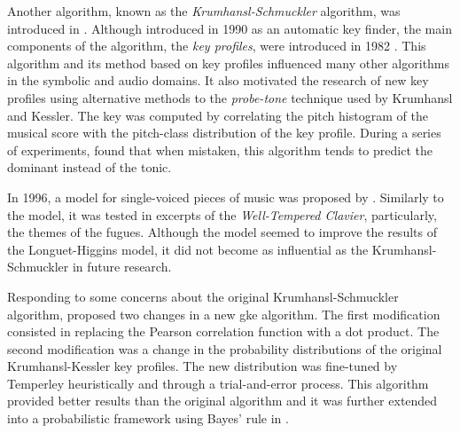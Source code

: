Another algorithm, known as the \emph{Krumhansl-Schmuckler}
algorithm, was introduced in
\textcite{krumhansl1990cognitive}. Although introduced in
1990 as an automatic key finder, the main components of the
algorithm, the \emph{key profiles}, were introduced in 1982
\parencite{krumhansl1982tracing}. This algorithm and its
method based on key profiles influenced many other
algorithms in the symbolic and audio domains. It also
motivated the research of new key profiles using alternative
methods to the \emph{probe-tone} technique used by Krumhansl
and Kessler. The key was computed by correlating the pitch
histogram of the musical score with the pitch-class
distribution of the key profile. During a series of
experiments, \textcite{sapp2011computational} found that
when mistaken, this algorithm tends to predict the dominant
instead of the tonic.

In 1996, a model for single-voiced pieces of music was
proposed by \textcite{vos1996parallelprocessing}. Similarly
to the \textcite{longuethiggins1971interpreting} model, it
was tested in excerpts of the \emph{Well-Tempered Clavier},
particularly, the themes of the fugues. Although the model
seemed to improve the results of the Longuet-Higgins model,
it did not become as influential as the Krumhansl-Schmuckler
in future research.

Responding to some concerns about the original
Krumhansl-Schmuckler algorithm,
\textcite{temperley1999whats} proposed two changes in a new
\gls{gke} algorithm. The first modification consisted in
replacing the Pearson correlation function with a dot
product. The second modification was a change in the
probability distributions of the original Krumhansl-Kessler
key profiles. The new distribution was fine-tuned by
Temperley heuristically and through a trial-and-error
process. This algorithm provided better results than the
original algorithm and it was further extended into a
probabilistic framework using Bayes' rule in
\textcite{temperley2002bayesian}.




